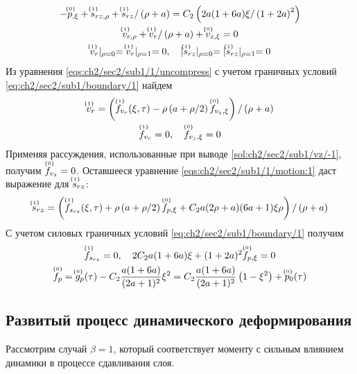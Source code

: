 \begin{gather}
  \label{eqs:ch2/sec2/sub1/1/motion:1}
  -\uindex{p}{0}_{,\xi} + \uindex{s}{1}_{rz,\rho} + \uindex{s}{1}_{rz} / \left(\rho+a\right) = C_2 \left(2a(1+6a)\xi/\left(1+2a\right)^2\right)
  \\
  \label{eqs:ch2/sec2/sub1/1/uncompress}
  \uindex{v}{1}_{r,\rho} + \uindex{v}{1}_{r} / \left(\rho+a\right) + \uindex{v}{0}_{z,\xi} = 0
  \\
  \label{eq:ch2/sec2/sub1/boundary/1}
  \uindex{v}{1}_{r}\lvert_{\rho=0} = \uindex{v}{1}_{r}\lvert_{\rho=1} = 0, \quad \lvert \uindex{s}{1}_{rz}\lvert_{\rho=0} = \lvert \uindex{s}{1}_{rz}\lvert_{\rho=1} = 0
\end{gather}
Из уравнения \cref{eqs:ch2/sec2/sub1/1/uncompress} с учетом граничных условий \cref{eq:ch2/sec2/sub1/boundary/1} найдем
\begin{gather*}
  \uindex{v}{1}_{r} = \left(\uindex{f}{1}_{v_{r}}(\xi, \tau) -\rho \left(a+\rho/2\right) \uindex{f}{0}_{v_{z},\xi}\right) / \left(\rho+a\right)
  \\
  \uindex{f}{1}_{v_{r}} = 0, \quad \uindex{f}{0}_{v_{z},\xi}=0
\end{gather*}
Применяя рассуждения, использованные при выводе \cref{sol:ch2/sec2/sub1/vz/-1}, получим $\uindex{f}{0}_{v_{z}} = 0$. Оставшееся уравнение \cref{eqs:ch2/sec2/sub1/1/motion:1} даст выражение для $\uindex{s}{1}_{rz}$:
\begin{equation*}
  \uindex{s}{1}_{rz} = \left(\uindex{f}{1}_{s_{rz}}(\xi, \tau) + \rho \left(a+\rho/2\right) \uindex{f}{0}_{p,\xi} + C_2 a(2\rho+a)(6a+1)\xi\rho\right) / \left(\rho+a\right)
\end{equation*}
С учетом силовых граничных условий \cref{eq:ch2/sec2/sub1/boundary/1} получим
\begin{gather*}
  \uindex{f}{1}_{s_{rz}} = 0, \quad 2 C_2 a(1+6a)\xi + (1+2a)^2 \uindex{f}{0}_{p,\xi} = 0
  \\
  \uindex{f}{0}_{p} = \uindex{g}{0}_{p}(\tau) - C_2 \frac{a(1+6a)}{(2a+1)^2}\xi^2 = C_2 \frac{a(1+6a)}{(2a+1)^2}\left(1-\xi^2\right) + \uindex{p}{0}_{0}(\tau)
\end{gather*}
\subsection{Развитый процесс динамического деформирования}\label{subsec:ch2/sec2/sub2}

Рассмотрим случай $\beta=1$, который соответствует моменту с сильным влиянием динамики в процессе сдавливания слоя.


